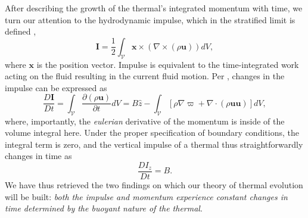 \documentclass[twocolumn, amsmath, amsfonts, amssymb, trackchanges]{aastex62}
\newcommand{\Div}[1]{\ensuremath{\nabla\cdot\left( #1\right)}}
\newcommand{\grad}{\ensuremath{\nabla}}
\begin{document}
After describing the growth of the thermal's integrated momentum with time, we turn our attention to the hydrodynamic impulse, which in the stratified limit is defined
\citep{shivamoggi2010},
\begin{equation}
\bm{I} = \frac{1}{2}\int_{\mathcal{V}} \bm{x}\times(\grad\times(\rho\bm{u}))dV,
\end{equation}
where $\bm{x}$ is the position vector. 
Impulse is equivalent to the time-integrated work acting on the fluid resulting in the current fluid motion. 
Per \citet{shivamoggi2010}, changes in the impulse can be expressed as
\begin{equation*}
\frac{D\bm{I}}{D t} = \int_{\mathcal{V}}\frac{\partial(\rho\bm{u})}{\partial t}dV
= B\hat{z} - \int_{\mathcal{V}}\left[\rho\grad\varpi + \Div{\rho\bm{u}\bm{u}}\right]dV ,
\end{equation*}
where, importantly, the \emph{eulerian} derivative of the momentum is inside of the volume integral here. 
Under the proper specification of boundary conditions, the integral term is zero, and the vertical impulse of a thermal thus straightforwardly changes in time as
\begin{equation}
\frac{D I_z}{D t} = B.
\label{eqn:change_in_impulse}
\end{equation}
We have thus retrieved the two findings on which our theory of thermal evolution will be built: \emph{both the impulse and momentum experience constant changes in time determined by the buoyant nature of the thermal}.
\end{document}
